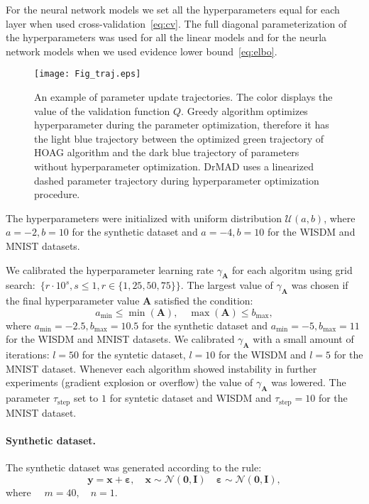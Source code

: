 \documentclass[smallextended]{svjour3}
\begin{document}
For the neural network models we set all the hyperparameters equal for each layer when used  cross-validation~\eqref{eq:cv}. The full diagonal parameterization of the hyperparameters was used for all the linear models and for the neurla network models when we used evidence lower bound~\eqref{eq:elbo}.


\begin{figure*}[tbh!]
    \centering
    \texttt{[image: Fig\_traj.eps]}

    \caption{An example of parameter update trajectories. The color displays the value of the validation function $Q$. Greedy algorithm optimizes hyperparameter during the parameter optimization, therefore it has the light blue trajectory between the optimized green trajectory of HOAG algorithm and the dark blue trajectory of parameters without hyperparameter optimization. DrMAD uses a linearized dashed parameter trajectory during hyperparameter optimization procedure.  }
    \end{figure*}


The hyperparameters were initialized with uniform distribution $\mathcal{U}(a,b)$,
where $a = -2, b = 10$ for the synthetic dataset and $a = -4, b = 10$  for the WISDM and MNIST datasets.

We calibrated the hyperparameter learning rate $\gamma_{\mathbf{A}}$  for each algoritm using grid search:~$\{r \cdot 10^{s}, s \leq 1, r \in \{1,25,50,75\}\}$. The largest value of $\gamma_{\mathbf{A}}$ was chosen if the final hyperparameter value $\mathbf{A}$ satisfied the condition:
\[
    a_\text{min} \leq  \min(\mathbf{A}), \quad \max(\mathbf{A}) \leq b_\text{max},
\] 
where $a_\text{min} = -2.5, b_\text{max}=10.5$ for the synthetic dataset and $a_\text{min} = -5, b_\text{max}=11$ for the WISDM and MNIST datasets. We calibrated $\gamma_\mathbf{A}$ with a small amount of iterations: $l=50$ for the syntetic dataset, $l=10$ for the WISDM and $l=5$ for the MNIST dataset. Whenever each algorithm showed instability in further experiments (gradient explosion or overflow) the value of $\gamma_{\mathbf{A}}$ was lowered. The parameter $\tau_\text{step}$ set to $1$ for syntetic dataset and WISDM and  $\tau_\text{step}=10$ for the MNIST dataset.



\paragraph{Synthetic dataset.}
The synthetic dataset was generated according to the rule:
\[
	\mathbf{y} = \mathbf{x} + \boldsymbol{\varepsilon},\quad \mathbf{x}  \sim \mathcal{N}(\mathbf{0}, \mathbf{I}) \quad \boldsymbol{\varepsilon} \sim \mathcal{N}(\mathbf{0}, \mathbf{I}),
\]
where $\quad m = 40, \quad n = 1.$
\end{document}
